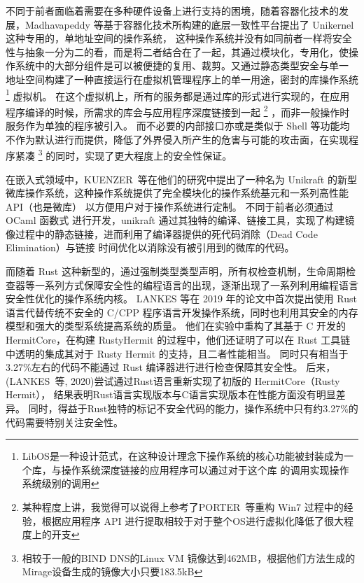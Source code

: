     不同于前者面临着需要在多种硬件设备上进行支持的困境，随着容器化技术的发展，Madhavapeddy 等基于容器化技术所构建的底层一致性平台提出了 Unikernel 这种专用的，单地址空间的操作系统，
    这种操作系统并没有如同前者一样将安全性与抽象一分为二的看，而是将二者结合在了一起，其通过模块化，专用化，使操作系统中的大部分组件是可以被便捷的复用、裁剪。又通过静态类型安全与单一
    地址空间构建了一种直接运行在虚拟机管理程序上的单一用途，密封的库操作系统\footnote{LibOS是一种设计范式，在这种设计理念下操作系统的核心功能被封装成为一个库，与操作系统深度链接的应用程序可以通过对于这个库
    的调用实现操作系统级别的调用} 虚拟机。
    在这个虚拟机上，所有的服务都是通过库的形式进行实现的，在应用程序编译的时候，所需求的库会与应用程序深度链接到一起
    \footnote{某种程度上讲，我觉得可以说得上参考了PORTER 等重构 Win7 过程中的经验，根据应用程序 API 进行提取相较于对于整个OS进行虚拟化降低了很大程度上的开支\cite{porter_rethinking_nodate}}
    ，而非一般操作时服务作为单独的程序被引入。
    而不必要的内部接口亦或是类似于 Shell 等功能均不作为默认进行而提供，降低了外界侵入所产生的危害与可能的攻击面，在实现程序紧凑
    \footnote{相较于一般的BIND DNS的Linux VM 镜像达到462MB，根据他们方法生成的Mirage设备生成的镜像大小只要183.5kB}
    的同时，实现了更大程度上的安全性保证。\cite{madhavapeddy_unikernels_nodate}

    在嵌入式领域中，KUENZER 等在他们的研究中提出了一种名为 Unikraft 的新型微库操作系统，这种操作系统提供了完全模块化的操作系统基元和一系列高性能 API（也是微库） 以方便用户对于操作系统进行定制。
    不同于前者必须通过 OCaml 函数式 进行开发，unikraft 通过其独特的编译、链接工具，实现了构建镜像过程中的静态链接，进而利用了编译器提供的死代码消除（Dead Code Elimination）与链接
    时间优化以消除没有被引用到的微库的代码。
    \cite{kuenzer_unikraft_2021}

    而随着 Rust 这种新型的，通过强制类型类型声明，所有权检查机制，生命周期检查器等一系列方式保障安全性的编程语言的出现，逐渐出现了一系列利用编程语言安全性优化的操作系统内核。
    LANKES 等在 2019 年的论文中首次提出使用 Rust 语言代替传统不安全的 C/CPP 程序语言开发操作系统，同时也利用其安全的内存模型和强大的类型系统提高系统的质量。
    他们在实验中重构了其基于 C 开发的 HermitCore，在构建 RustyHermit 的过程中，他们还证明了可以在 Rust 工具链中透明的集成其对于 Rusty Hermit 的支持，且二者性能相当。
    同时只有相当于 3.27\%左右的代码不能通过 Rust 编译器进行进行检查保障其安全性。
    \cite{lankes_exploring_2019, lankes_rustyhermit_2020}
    后来，(LANKES 等, 2020)尝试通过Rust语言重新实现了初版的 HermitCore（Rusty Hermit），
    结果表明Rust语言实现版本与C语言实现版本在性能方面没有明显差异。
    同时，得益于Rust独特的标记不安全代码的能力，操作系统中只有约3.27\%的代码需要特别关注安全性。

